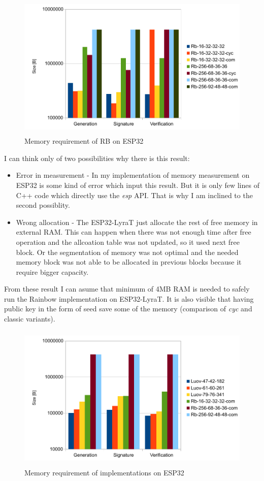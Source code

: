 \documentclass[thesis=M,english]{FITthesis}[2019/12/23]
\begin{document}
\begin{figure}[H]
\centering
\includegraphics[width=13cm,height=7cm]{images/mem-rb.pdf}
\caption{Memory requirement of RB on ESP32}
\label{mem-rb}
\end{figure}

\noindent
I can think only of two possibilities why there is this result:
\begin{itemize}
\item	Error in measurement - In my implementation of memory measurement on ESP32 is some kind of error which input this result. But it is only few lines of C++ code which directly use the \textit{esp} API. That is why I am inclined to the second possiblity.
\item	Wrong allocation - The ESP32-LyraT just allocate the rest of free memory in external RAM. This can happen when there was not enough time after free operation and the allcoation table was not updated, so it used next free block. Or the segmentation of memory was not optimal and the needed memory block was not able to be allocated in previous blocks because it require bigger capacity.
\end{itemize}

\bigskip
\noindent
From these result I can asume that minimum of 4MB RAM is needed to safely run the Rainbow implementation on ESP32-LyraT. It is also visible that having public key in the form of seed save some of the memory (comparison of \textit{cyc} and classic variants).

\begin{figure}[H]
\centering
\includegraphics[width=13cm,height=7cm]{images/mem-both.pdf}
\caption{Memory requirement of implementations on ESP32}
\label{mem-both}
\end{figure}
\end{document}
